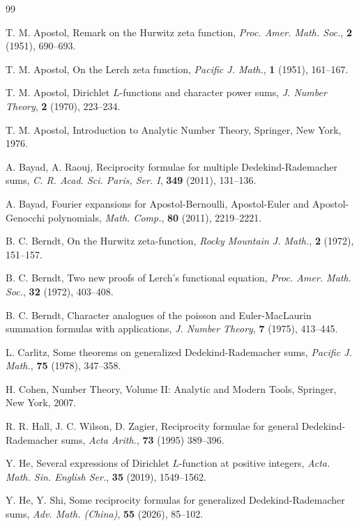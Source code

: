 \documentclass[reqno]{amsart}
\numberwithin{equation}{section}
\begin{document}
\begin{thebibliography}{99}

 T. M. Apostol, Remark on the Hurwitz zeta function, \emph{Proc. Amer. Math. Soc.}, \textbf{2} (1951), 690--693.

 T. M. Apostol, On the Lerch zeta function, \emph{Pacific J. Math.}, \textbf{1} (1951), 161--167.

 T. M. Apostol, Dirichlet $L$-functions and character power sums, \emph{J. Number Theory}, \textbf{2} (1970), 223--234.

 T. M. Apostol, Introduction to Analytic Number Theory, Springer, New York, 1976.

 A. Bayad, A. Raouj, Reciprocity formulae for multiple Dedekind-Rademacher sums, \emph{C. R. Acad. Sci. Paris, Ser. I}, \textbf{349} (2011), 131--136.

 A. Bayad, Fourier expansions for Apostol-Bernoulli, Apostol-Euler and Apostol-Genocchi polynomials, \emph{Math. Comp.}, \textbf{80} (2011), 2219--2221.

 B. C. Berndt, On the Hurwitz zeta-function, \emph{Rocky Mountain J. Math.}, \textbf{2} (1972), 151--157.

 B. C. Berndt, Two new proofs of Lerch's functional equation, \emph{Proc. Amer. Math. Soc.}, \textbf{32} (1972), 403--408.

 B. C. Berndt, Character analogues of the poisson and Euler-MacLaurin summation formulas with applications, \emph{J. Number Theory}, \textbf{7} (1975), 413--445.

 L. Carlitz, Some theorems on generalized Dedekind-Rademacher sums, \emph{Pacific J. Math.}, \textbf{75} (1978), 347--358.

 H. Cohen, Number Theory, Volume II: Analytic and Modern Tools, Springer, New York, 2007.

 R. R. Hall, J. C. Wilson, D. Zagier, Reciprocity formulae for general Dedekind-Rademacher sums, \emph{Acta Arith.}, \textbf{73} (1995) 389--396.

 Y. He, Several expressions of Dirichlet $L$-function at positive integers, \emph{Acta. Math. Sin. English Ser.}, \textbf{35} (2019), 1549--1562.

 Y. He, Y. Shi, Some reciprocity formulas for generalized Dedekind-Rademacher sums, \emph{Adv. Math. (China)}, \textbf{55} (2026), 85--102.


\end{thebibliography}
\end{document}
